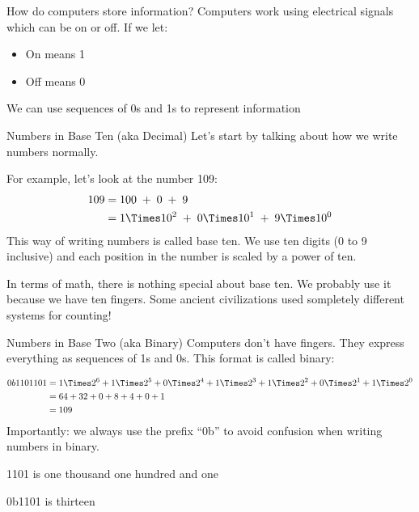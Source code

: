 

\begin{frame}{How do computers store information?}
    Computers work using electrical signals which can be on or off. If we let:
    \begin{itemize}
        \item On means 1
        \item Off means 0
    \end{itemize}
    We can use sequences of 0s and 1s to represent information
\end{frame}


\begin{frame}{Numbers in Base Ten (aka Decimal)}
    Let's start by talking about how we write numbers normally.

    For example, let's look at the number 109:
    \begin{align*}
        109 & = 100 \;+\; 0 \;+\; 9                                   \\
            & = 1 \Times 10^2 \;+\; 0 \Times 10^1 \;+\; 9 \Times 10^0
    \end{align*}
    This way of writing numbers is called base ten.
    We use ten digits (0 to 9 inclusive) and each position in the number is scaled by a power of ten.

    In terms of math, there is nothing special about base ten. We probably use it
    because we have ten fingers. Some ancient civilizations used sompletely
    different systems for counting!
\end{frame}

\begin{frame}{Numbers in Base Two (aka Binary)}
    Computers don't have fingers. They express everything as sequences of 1s and 0s. This format is called binary:

    \begin{align*}
        0b1101101 & =
        1 \Times 2^6 +
        1 \Times 2^5 +
        0 \Times 2^4 +
        1 \Times 2^3 +
        1 \Times 2^2 +
        0 \Times 2^1 +
        1 \Times 2^0                              \\
                  & = 64 + 32 + 0 + 8 + 4 + 0 + 1 \\
                  & = 109                         \\
    \end{align*}
    Importantly: we always use the prefix ``0b'' to avoid confusion when writing numbers in binary.

    1101 is one thousand one hundred and one

    0b1101 is thirteen
\end{frame}

